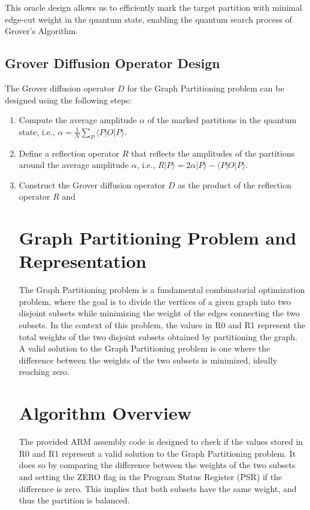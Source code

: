 This oracle design allows us to efficiently mark the target partition with minimal edge-cut weight in the quantum state, enabling the quantum search process of Grover's Algorithm.

\subsection{Grover Diffusion Operator Design}

The Grover diffusion operator $D$ for the Graph Partitioning problem can be designed using the following steps:

\begin{enumerate}
\item Compute the average amplitude $\alpha$ of the marked partitions in the quantum state, i.e., $\alpha=\frac{1}{N}\sum_{P} \langle P|O|P\rangle$.
\item Define a reflection operator $R$ that reflects the amplitudes of the partitions around the average amplitude $\alpha$, i.e., $R|P\rangle=2\alpha|P\rangle-\langle P|O|P\rangle$.
\item Construct the Grover diffusion operator $D$ as the product of the reflection operator $R$ and

\section{Graph Partitioning Problem and Representation}

The Graph Partitioning problem is a fundamental combinatorial optimization problem, where the goal is to divide the vertices of a given graph into two disjoint subsets while minimizing the weight of the edges connecting the two subsets. In the context of this problem, the values in R0 and R1 represent the total weights of the two disjoint subsets obtained by partitioning the graph. A valid solution to the Graph Partitioning problem is one where the difference between the weights of the two subsets is minimized, ideally reaching zero.

\section{Algorithm Overview}

The provided ARM assembly code is designed to check if the values stored in R0 and R1 represent a valid solution to the Graph Partitioning problem. It does so by comparing the difference between the weights of the two subsets and setting the ZERO flag in the Program Status Register (PSR) if the difference is zero. This implies that both subsets have the same weight, and thus the partition is balanced.


\end{enumerate}
